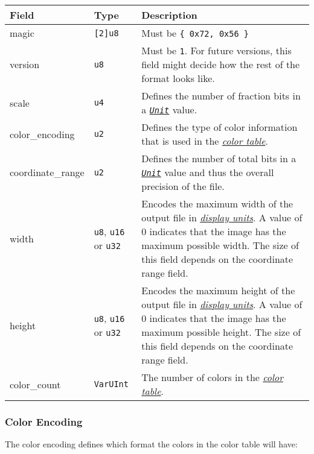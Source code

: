 \documentclass[]{article}
\newcommand{\link}[2]{\hyperlink{#1}{\emph{#2}}}
\begin{document}
\begin{longtable}[]{@{}p{1in}p{1in}p{4in}@{}}
\toprule
Field & Type & Description \\
\midrule
\endhead
magic & \texttt{{[}2{]}u8} & Must be \texttt{\{\ 0x72,\ 0x56\ \}} \\
version & \texttt{u8} & Must be \texttt{1}. For future versions, this field might decide how the rest of the format looks like. \\
scale & \texttt{u4} & Defines the number of fraction bits in a \link{units}{\texttt{Unit}} value. \\
color\_encoding & \texttt{u2} & Defines the type of color information that is used in the \link{color-table}{color table}. \\
coordinate\_range & \texttt{u2} & Defines the number of total bits in a \link{units}{\texttt{Unit}} value and thus the overall precision of the file. \\
width & \texttt{u8}, \texttt{u16} or \texttt{u32} & Encodes the maximum width of the output file in \link{display-units}{display units}. A value of 0 indicates that the image has the maximum possible width. The size of this field depends on the coordinate range field. \\
height & \texttt{u8}, \texttt{u16} or \texttt{u32} & Encodes the maximum height of the output file in \link{display-units}{display units}. A value of 0 indicates that the image has the maximum possible height. The size of this field depends on the coordinate range field. \\
color\_count & \texttt{VarUInt} & The number of colors in the \link{color-table}{color table}. \\
\bottomrule
\end{longtable}

\hypertarget{color-encoding}{\subsubsection{Color Encoding}\label{color-encoding}}

The color encoding defines which format the colors in the color table
will have:
\end{document}
